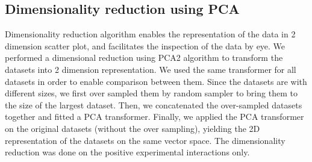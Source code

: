 \documentclass{bmcart}
\begin{document}
\subsection*{Dimensionality reduction using PCA}
Dimensionality reduction algorithm enables the representation of the data in 2 dimension scatter plot, and facilitates the inspection of the data by eye. We performed a dimensional reduction using PCA2 algorithm to transform the datasets into 2 dimension representation. 
We used the same transformer for all datasets in order to enable comparison between them. 
Since the datasets are with different sizes, we first over sampled them by random sampler to bring them to the size of the largest dataset. Then, we concatenated the over-sampled datasets together and fitted a PCA transformer. Finally, we applied the PCA transformer on the original datasets (without the over sampling), yielding the 2D representation of the datasets on the same vector space. 
The dimensionality reduction was done on the positive experimental interactions only.


\end{document}
